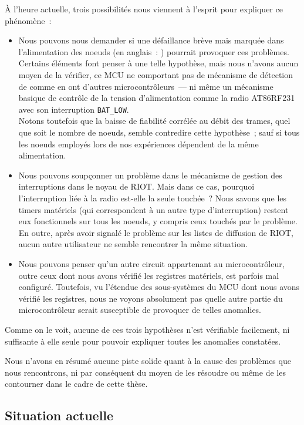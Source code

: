 \medskip

\`A l'heure actuelle, trois possibilités nous viennent à l'esprit
pour expliquer ce phénomène~:
\begin{itemize}
\item Nous pouvons nous demander si une défaillance brève mais marquée
dans l'alimentation des noeuds (en anglais~: ) pourrait
provoquer ces problèmes. Certains éléments font penser à une telle
hypothèse, mais nous n'avons aucun moyen de la vérifier, ce MCU ne
comportant pas de mécanisme de détection de  comme
en ont d'autres microcontrôleurs~--- ni même un mécanisme basique de
contrôle de la tension d'alimentation comme la radio AT86RF231
avec son interruption \texttt{BAT\_LOW}.\\
Notons toutefois que la baisse de fiabilité corrélée au débit des
trames, quel que soit le nombre de noeuds, semble contredire cette
hypothèse~; sauf si tous les noeuds employés lors de nos expériences
dépendent de la même alimentation.
\item Nous pouvons soupçonner un problème dans le mécanisme de gestion
des interruptions dans le noyau de RIOT. Mais dans ce cas, pourquoi
l'interruption liée à la radio est-elle la seule touchée~? Nous savons
que les timers matériels (qui correspondent à un autre type d'interruption)
restent eux fonctionnels sur tous les noeuds, y compris ceux touchés par
le problème. En outre, après avoir signalé le problème sur les listes
de diffusion de RIOT, aucun autre utilisateur ne semble rencontrer la
même situation.
\item Nous pouvons penser qu'un autre circuit appartenant au microcontrôleur,
outre ceux dont nous avons vérifié les registres matériels, est parfois mal
configuré. Toutefois, vu l'étendue des sous-systèmes du MCU dont nous avons
vérifié les registres, nous ne voyons absolument pas quelle autre partie du
microcontrôleur serait susceptible de provoquer de telles anomalies.
\end{itemize}
Comme on le voit, aucune de ces trois hypothèses n'est vérifiable facilement,
ni suffisante à elle seule pour pouvoir expliquer toutes les anomalies
constatées.

Nous n'avons en résumé aucune piste solide quant à la cause des
problèmes que nous rencontrons, ni par conséquent du moyen de les
résoudre ou même de les contourner dans le cadre de cette thèse.


\subsection{Situation actuelle}
\label{SubsecEtatActuel}

